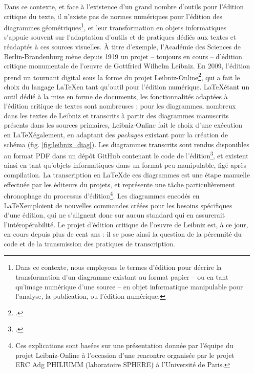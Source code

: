 		Dans ce contexte, et face à l'existence d'un grand nombre d'outils pour l'édition critique du texte, il n'existe pas de normes numériques pour l'édition des diagrammes géométriques\footnote{Dans ce contexte, nous employons le termes d'\og édition \fg pour décrire la transformation d'un diagramme existant au format papier -- ou en tant qu'image numérique d'une source -- en objet informatique manipulable pour l'analyse, la publication, ou l'édition numérique.}, et leur transformation en objets informatiques s'appuie souvent sur l'adaptation d'outils et de pratiques dédiés aux textes et réadaptés à ces sources visuelles. À titre d'exemple, l'Académie des Sciences de Berlin-Brandenburg mène depuis 1919 un projet -- toujours en cours -- d'édition critique monumentale de l'œuvre de Gottfried Wilhelm Leibniz. En 2009, l'édition prend un tournant digital sous la forme du projet Leibniz-Online\footcite{LeibnizOnlineLeibnizEdition}, qui a fait le choix du langage \LaTeX en tant qu'outil pour l'édition numérique. \LaTeX étant un outil dédié à la mise en forme de documents, les fonctionnalités adaptées à l'édition critique de textes sont nombreuses ; pour les diagrammes, nombreux dans les textes de Leibniz et transcrits à partir des diagrammes manuscrits présents dans les sources primaires, Leibniz-Online fait le choix d'une exécution en \LaTeX également, en adaptant des \textit{packages} existant pour la création de schéma (fig. \ref{fig:leibniz_diag}). Les diagrammes transcrits sont rendus disponibles au format PDF dans un dépôt GitHub contenant le code de l'édition\footcite{TelotaLeibnizVIIILaTeX_TEI}, et existent ainsi en tant qu'objets informatiques dans un format peu manipulable, figé après compilation. La transcription en \LaTeX de ces diagrammes est une étape manuelle effectuée par les éditeurs du projets, et représente une tâche particulièrement chronophage du processus d'édition\footnote{Ces explications sont basées sur une présentation donnée par l'équipe du projet Leibniz-Online à l'occasion d'une rencontre organisée par le projet ERC Adg PHILIUMM (laboratoire SPHERE) à l'Université de Paris.}. Les diagrammes encodés en \LaTeX emploient de nouvelles commandes créées pour les besoins spécifiques d'une édition, qui ne s'alignent donc sur aucun standard qui en assurerait l'intéropérabilité. Le projet d'édition critique de l'œuvre de Leibniz est, à ce jour, en cours depuis plus de cent ans : il se pose ainsi la question de la pérennité du code et de la transmission des pratiques de transcription. 
		
